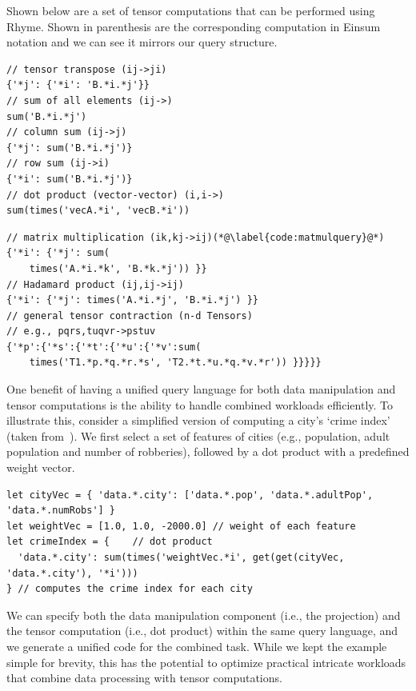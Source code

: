 \documentclass[runningheads]{llncs}
\newcommand{\lang}{Rhyme}
\begin{document}
Shown below are a set of tensor computations that can be performed using \lang{}.
Shown in parenthesis are the corresponding computation in Einsum notation
and we can see it mirrors our query structure.

\hspace{-18pt}
\begin{minipage}{0.5\textwidth}
\begin{lstlisting}[style=JavaScript,columns=flexible]
// tensor transpose (ij->ji)
{'*j': {'*i': 'B.*i.*j'}}
// sum of all elements (ij->)
sum('B.*i.*j')
// column sum (ij->j)
{'*j': sum('B.*i.*j')}
// row sum (ij->i)
{'*i': sum('B.*i.*j')}
// dot product (vector-vector) (i,i->)
sum(times('vecA.*i', 'vecB.*i'))
\end{lstlisting}
\end{minipage}%
\begin{minipage}{0.5\textwidth}
\begin{lstlisting}[style=JavaScript,columns=flexible]
// matrix multiplication (ik,kj->ij)(*@\label{code:matmulquery}@*)
{'*i': {'*j': sum(
    times('A.*i.*k', 'B.*k.*j')) }}
// Hadamard product (ij,ij->ij)
{'*i': {'*j': times('A.*i.*j', 'B.*i.*j') }}
// general tensor contraction (n-d Tensors)
// e.g., pqrs,tuqvr->pstuv
{'*p':{'*s':{'*t':{'*u':{'*v':sum(
    times('T1.*p.*q.*r.*s', 'T2.*t.*u.*q.*v.*r')) }}}}}
\end{lstlisting}
\end{minipage}

One benefit of having a unified query language for both data manipulation and tensor
computations is the ability to handle combined workloads efficiently.
To illustrate this, consider a simplified version of computing a city's
`crime index' (taken from~\cite{weld}).
We first select a set of features of cities (e.g., population, 
adult population and number of robberies), followed by a dot product
with a predefined weight vector.

\begin{lstlisting}[style=JavaScript,columns=flexible]
let cityVec = { 'data.*.city': ['data.*.pop', 'data.*.adultPop', 'data.*.numRobs'] }
let weightVec = [1.0, 1.0, -2000.0] // weight of each feature
let crimeIndex = {    // dot product
  'data.*.city': sum(times('weightVec.*i', get(get(cityVec, 'data.*.city'), '*i')))
} // computes the crime index for each city
\end{lstlisting}

We can specify both the data manipulation component (i.e., the projection) and
the tensor computation (i.e., dot product) within the same query language, and
we generate a unified code for the combined task.
While we kept the example simple for brevity, this has the potential to optimize practical
intricate workloads that combine data processing with tensor computations.
\end{document}
